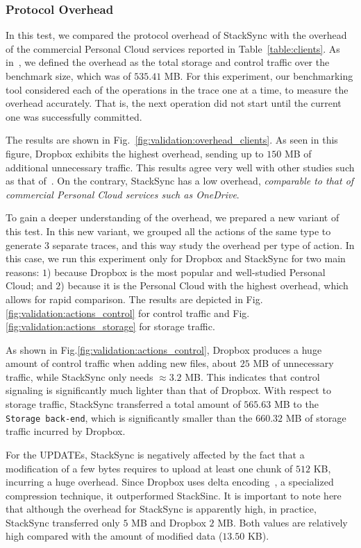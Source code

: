 \subsubsection{Protocol Overhead}
In this test, we compared the protocol overhead of StackSync with the overhead of the
commercial Personal Cloud services reported in Table~\ref{table:clients}. As in~\cite{drago2013benchmarking},
we defined the overhead as the total storage and control traffic over the benchmark size, which was of 
$535.41$ MB. For this experiment, our benchmarking tool considered each of the operations in the trace one at a time,
to measure the overhead accurately. That is, the next operation did not start until the current one was
successfully committed.

The results are shown in Fig.~\ref{fig:validation:overhead_clients}. As seen in this
figure, Dropbox exhibits the highest overhead, sending up to $150$ MB of additional
unnecessary traffic. This results agree very well with other studies such as that
of~\cite{li13}. On the contrary, StackSync has a low overhead, \textit{comparable to that of commercial
Personal Cloud services such as OneDrive}.

To gain a deeper understanding of the overhead, we prepared a new variant of
this test. In this new variant, we grouped all the actions of the same type to generate $3$ separate traces,
and this way study the overhead per type of action. In this case, we run this experiment only for Dropbox and StackSync
for two main reasons: $1$) because 
Dropbox is the most popular and well-studied Personal Cloud; and $2$) because
it is the Personal Cloud with the highest overhead, which allows for rapid comparison. 
The results are depicted in Fig.\ref{fig:validation:actions_control} for control traffic and Fig.\ref{fig:validation:actions_storage}
for storage traffic.

As shown in Fig.\ref{fig:validation:actions_control}, Dropbox produces a huge amount of control traffic
when adding new files, about $25$ MB of unnecessary traffic, while StackSync only needs $\approx 3.2$ MB.
This indicates that control signaling is significantly much lighter than that of Dropbox. With respect
to storage traffic, StackSync transferred a total amount of $565.63$ MB to the \texttt{Storage back-end},
which is significantly smaller than the $660.32$ MB of storage traffic incurred by Dropbox.

For the UPDATEs, StackSync is negatively affected by the fact that a modification of a few bytes requires to upload at 
least one chunk of  $512$ KB, incurring a huge overhead. Since Dropbox uses delta encoding~\cite{drago2013benchmarking}, a specialized
compression technique, it outperformed StackSinc. It is important to note here that although the 
overhead for StackSync is apparently high, in practice, StackSync transferred only $5$ MB and Dropbox $2$ MB. 
Both values are relatively high compared with the amount of  modified data ($13.50$ KB). 

